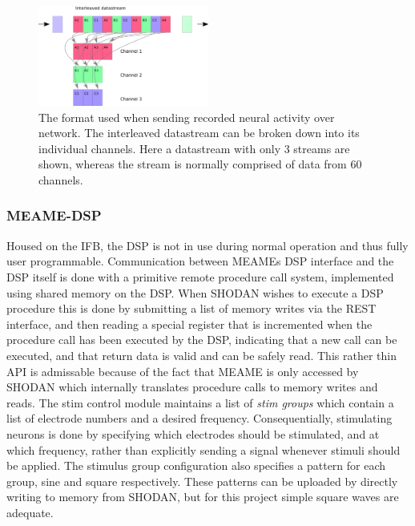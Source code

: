 \begin{figure}[h!]
  \centering
  \includegraphics[width=0.5\textwidth]{fig/reorder.png}
  \caption{
    The format used when sending recorded neural activity over network.
    The interleaved datastream can be broken down into its individual channels.
    Here a datastream with only 3 streams are shown, whereas the stream is
    normally comprised of data from 60 channels.
  }
  \label{figLayout}
\end{figure}
\subsubsection{MEAME-DSP}
Housed on the IFB, the DSP is not in use during normal operation and thus fully
user programmable.
Communication between MEAMEs DSP interface and the DSP itself is done with a
primitive remote procedure call system, implemented using shared memory on the
DSP.
When SHODAN wishes to execute a DSP procedure this is done by submitting a list
of memory writes via the REST interface, and then reading a special register
that is incremented when the procedure call has been executed by the DSP,
indicating that a new call can be executed, and that return data is valid and
can be safely read.
This rather thin API is admissable because of the fact that MEAME is only
accessed by SHODAN which internally translates procedure calls to memory writes
and reads.
The stim control module maintains a list of \emph{stim groups} which contain a
list of electrode numbers and a desired frequency.
Consequentially, stimulating neurons is done by specifying which electrodes
should be stimulated, and at which frequency, rather than explicitly sending a
signal whenever stimuli should be applied.
The stimulus group configuration also specifies a pattern for each group, sine
and square respectively.
These patterns can be uploaded by directly writing to memory from SHODAN, but
for this project simple square waves are adequate.
